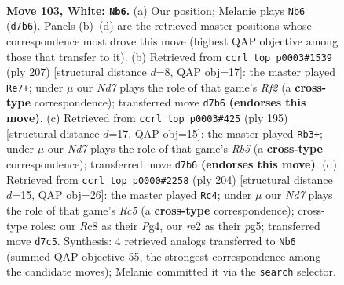 \documentclass[11pt]{article}
\begin{document}
\clearpage

\begin{figure}[p]\centering
\begin{subfigure}{0.46\textwidth}\centering
\resizebox{\linewidth}{!}{%
\newchessgame
\chessboard[
  setfen={2R5/3N2pk/5p2/7p/7P/6PK/4r3/8 w - - 30 103},
  showmover=false,
  pgfstyle=straightmove, color=movearrow, markmove={d7-b6}
]}
\caption{}
\end{subfigure}\hfill
\begin{subfigure}{0.46\textwidth}\centering
\resizebox{\linewidth}{!}{%
\newchessgame
\chessboard[
  setfen={8/5r2/6pk/7p/7P/4KPP1/2R5/8 b - - 75 104},
  showmover=false,
  pgfstyle=straightmove, color=movearrow, markmove={f7-e7}
]}
\caption{}
\end{subfigure}
\\[4pt]
\begin{subfigure}{0.46\textwidth}\centering
\resizebox{\linewidth}{!}{%
\newchessgame
\chessboard[
  setfen={8/5pk1/R6p/5P2/1r4P1/4KP2/8/8 b - - 82 98},
  showmover=false,
  pgfstyle=straightmove, color=movearrow, markmove={b4-b3}
]}
\caption{}
\end{subfigure}\hfill
\begin{subfigure}{0.46\textwidth}\centering
\resizebox{\linewidth}{!}{%
\newchessgame
\chessboard[
  setfen={8/6k1/4r3/2R1p1p1/5pP1/5P2/4PK2/8 w - - 8 103},
  showmover=false,
  pgfstyle=straightmove, color=movearrow, markmove={c5-c4}
]}
\caption{}
\end{subfigure}
\caption{\textbf{Move 103, White: \texttt{Nb6}.} (a) Our position; Melanie plays \texttt{Nb6} (\texttt{d7b6}). Panels (b)--(d) are the retrieved master positions whose correspondence most drove this move (highest QAP objective among those that transfer to it). (b) Retrieved from \texttt{ccrl\_top\_p0003\#1539} (ply 207) [structural distance $d$=8, QAP obj=17]: the master played \texttt{Re7+}; under $\mu$ our \emph{Nd7} plays the role of that game's \emph{Rf2} (a \textbf{cross-type} correspondence); transferred move \texttt{d7b6} \textbf{(endorses this move)}. (c) Retrieved from \texttt{ccrl\_top\_p0003\#425} (ply 195) [structural distance $d$=17, QAP obj=15]: the master played \texttt{Rb3+}; under $\mu$ our \emph{Nd7} plays the role of that game's \emph{Rb5} (a \textbf{cross-type} correspondence); transferred move \texttt{d7b6} \textbf{(endorses this move)}. (d) Retrieved from \texttt{ccrl\_top\_p0000\#2258} (ply 204) [structural distance $d$=15, QAP obj=26]: the master played \texttt{Rc4}; under $\mu$ our \emph{Nd7} plays the role of that game's \emph{Rc5} (a \textbf{cross-type} correspondence); cross-type roles: our \emph{R}c8 as their \emph{P}g4, our \emph{r}e2 as their \emph{p}g5; transferred move \texttt{d7c5}. Synthesis: 4 retrieved analogs transferred to \texttt{Nb6} (summed QAP objective 55, the strongest correspondence among the candidate moves); Melanie committed it via the \texttt{search} selector.}
\label{fig:thought-m204}
\end{figure}
\end{document}
